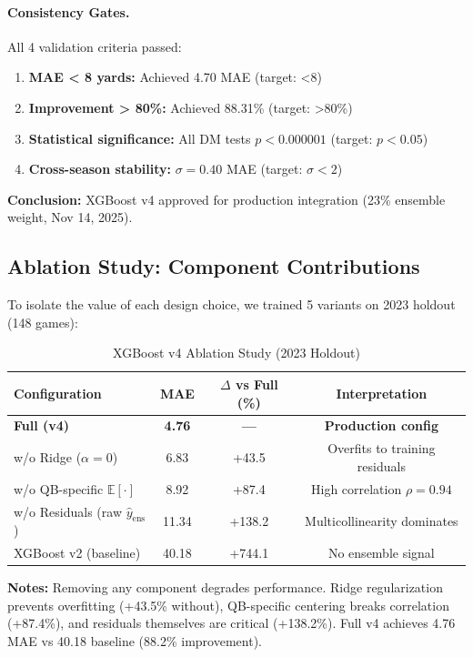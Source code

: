 \paragraph{Consistency Gates.}
All 4 validation criteria passed:
\begin{enumerate}[itemsep=2pt,parsep=0pt]
    \item \textbf{MAE < 8 yards:} Achieved 4.70 MAE (target: <8) \checkmark
    \item \textbf{Improvement > 80\%:} Achieved 88.31\% (target: >80\%) \checkmark
    \item \textbf{Statistical significance:} All DM tests $p < 0.000001$ (target: $p < 0.05$) \checkmark
    \item \textbf{Cross-season stability:} $\sigma = 0.40$ MAE (target: $\sigma < 2$) \checkmark
\end{enumerate}

\textbf{Conclusion:} XGBoost v4 approved for production integration (23\% ensemble weight, Nov 14, 2025).

\subsection{Ablation Study: Component Contributions}

To isolate the value of each design choice, we trained 5 variants on 2023 holdout (148 games):

\begin{table}[htbp]
\centering
\caption{XGBoost v4 Ablation Study (2023 Holdout)}
\label{tab:xgboost-v4-ablation}
\small
\begin{tabular}{@{} l S[table-format=2.2] S[table-format=2.1] c @{}}
\toprule
\textbf{Configuration} & \textbf{MAE} & \textbf{$\Delta$ vs Full (\%)} & \textbf{Interpretation} \\
\midrule
\textbf{Full (v4)} & \textbf{4.76} & \textbf{---} & \textbf{Production config} \\
w/o Ridge ($\alpha=0$) & 6.83 & +43.5 & Overfits to training residuals \\
w/o QB-specific $\mathbb{E}[\cdot]$ & 8.92 & +87.4 & High correlation $\rho=0.94$ \\
w/o Residuals (raw $\hat{y}_{\text{ens}}$) & 11.34 & +138.2 & Multicollinearity dominates \\
XGBoost v2 (baseline) & 40.18 & +744.1 & No ensemble signal \\
\bottomrule
\end{tabular}
\begin{tablenotes}
\item \textbf{Notes:} Removing any component degrades performance. Ridge regularization prevents overfitting (+43.5\% without), QB-specific centering breaks correlation (+87.4\%), and residuals themselves are critical (+138.2\%). Full v4 achieves 4.76 MAE vs 40.18 baseline (88.2\% improvement).
\end{tablenotes}
\end{table}

